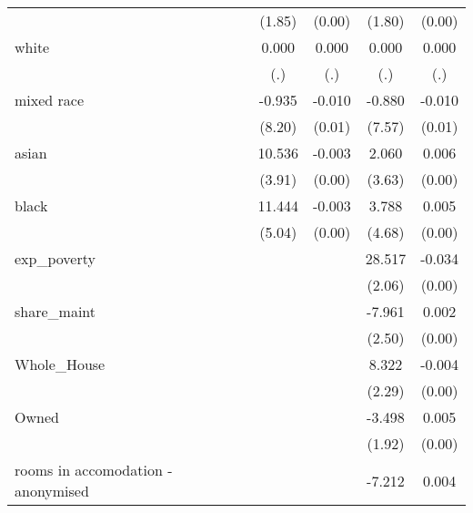 \begin{table}[htbp]
\begin{tabular}{l*{4}{c}}
                    &      (1.85)         &      (0.00)         &      (1.80)         &      (0.00)         \\
white               &       0.000         &       0.000         &       0.000         &       0.000         \\
                    &         (.)         &         (.)         &         (.)         &         (.)         \\
mixed race          &      -0.935         &      -0.010         &      -0.880         &      -0.010         \\
                    &      (8.20)         &      (0.01)         &      (7.57)         &      (0.01)         \\
asian               &      10.536\sym{**} &      -0.003         &       2.060         &       0.006         \\
                    &      (3.91)         &      (0.00)         &      (3.63)         &      (0.00)         \\
black               &      11.444\sym{*}  &      -0.003         &       3.788         &       0.005         \\
                    &      (5.04)         &      (0.00)         &      (4.68)         &      (0.00)         \\
exp\_poverty         &                     &                     &      28.517\sym{***}&      -0.034\sym{***}\\
                    &                     &                     &      (2.06)         &      (0.00)         \\
share\_maint         &                     &                     &      -7.961\sym{**} &       0.002         \\
                    &                     &                     &      (2.50)         &      (0.00)         \\
Whole\_House         &                     &                     &       8.322\sym{***}&      -0.004\sym{*}  \\
                    &                     &                     &      (2.29)         &      (0.00)         \\
Owned               &                     &                     &      -3.498         &       0.005\sym{***}\\
                    &                     &                     &      (1.92)         &      (0.00)         \\
rooms in accomodation - anonymised&                     &                     &      -7.212\sym{***}&       0.004\sym{***}\\

\end{tabular}
\end{table}
